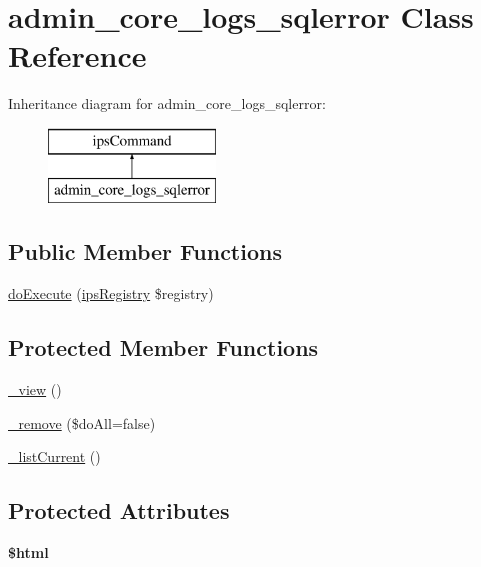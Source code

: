 \hypertarget{classadmin__core__logs__sqlerror}{\section{admin\-\_\-core\-\_\-logs\-\_\-sqlerror Class Reference}
\label{classadmin__core__logs__sqlerror}
}
Inheritance diagram for admin\-\_\-core\-\_\-logs\-\_\-sqlerror\-:\begin{figure}[H]
\begin{center}
\leavevmode
\includegraphics[height=2.000000cm]{classadmin__core__logs__sqlerror}
\end{center}
\end{figure}
\subsection*{Public Member Functions}
\begin{DoxyCompactItemize}
\item 
\hyperlink{classadmin__core__logs__sqlerror_afbc4e912a0604b94d47d66744c64d8ba}{do\-Execute} (\hyperlink{classips_registry}{ips\-Registry} \$registry)
\end{DoxyCompactItemize}
\subsection*{Protected Member Functions}
\begin{DoxyCompactItemize}
\item 
\hyperlink{classadmin__core__logs__sqlerror_aecb3513e402840411fb3737f4f2d3193}{\-\_\-view} ()
\item 
\hyperlink{classadmin__core__logs__sqlerror_a335c2a5437fe2277e3d028c75657bab8}{\-\_\-remove} (\$do\-All=false)
\item 
\hyperlink{classadmin__core__logs__sqlerror_abc03e9ca0857dea04554a012ac374f5a}{\-\_\-list\-Current} ()
\end{DoxyCompactItemize}
\subsection*{Protected Attributes}
\begin{DoxyCompactItemize}
\item 
\hypertarget{classadmin__core__logs__sqlerror_a6f96e7fc92441776c9d1cd3386663b40}{{\bfseries \$html}}\label{classadmin__core__logs__sqlerror_a6f96e7fc92441776c9d1cd3386663b40}

\end{DoxyCompactItemize}
